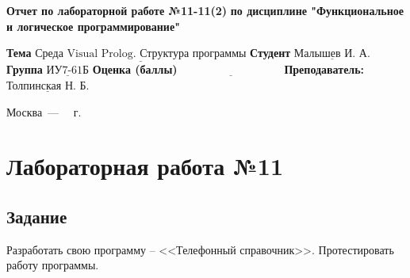 \documentclass[12pt]{report}
\begin{document}
\begin{titlepage}
		
		\begin{center}
			\noindent\begin{minipage}{1.3\textwidth}\centering
				\Large\textbf{  Отчет по лабораторной работе №11-11(2)}\newline
				\textbf{по дисциплине \newline "Функциональное и логическое программирование"}\newline\newline
			\end{minipage}
		\end{center}
		
		\noindent\textbf{Тема} $\underline{\text{Среда Visual Prolog. Структура программы}}$\newline\newline
		\noindent\textbf{Студент} $\underline{\text{Малышев И. А.}}$\newline\newline
		\noindent\textbf{Группа} $\underline{\text{ИУ7-61Б}}$\newline\newline
		\noindent\textbf{Оценка (баллы)} $\underline{\text{~~~~~~~~~~~~~~~~~~~~~~~~~~~}}$\newline\newline
		\noindent\textbf{Преподаватель: } $\underline{\text{Толпинская Н. Б.}}$\newline\newline\newline
		
		\begin{center}
			\vfill
			Москва~---~\the\year
			~г.
		\end{center}
	\end{titlepage}
	
	
	\setcounter{page}{2}

\chapter*{Лабораторная работа №11}
\section*{Задание}

Разработать свою программу -- <<Телефонный справочник>>. Протестировать работу программы.
\end{document}
